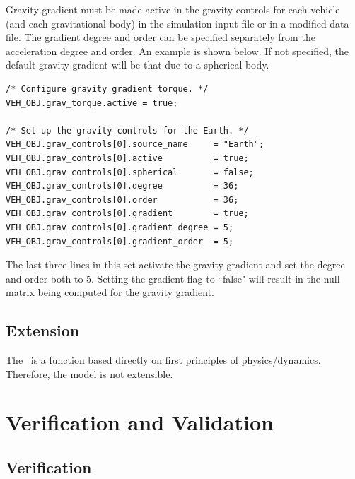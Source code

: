 Gravity gradient must be made active in the gravity controls for each vehicle (and
each gravitational body) in the simulation input file or in a modified data 
file.  The gradient degree and order can be specified separately from the acceleration
degree and order. An example is shown below. If not specified, the default gravity
gradient will be that due to a spherical body.
\begin{verbatim}
/* Configure gravity gradient torque. */
VEH_OBJ.grav_torque.active = true;

/* Set up the gravity controls for the Earth. */
VEH_OBJ.grav_controls[0].source_name     = "Earth";
VEH_OBJ.grav_controls[0].active          = true;
VEH_OBJ.grav_controls[0].spherical       = false;
VEH_OBJ.grav_controls[0].degree          = 36;
VEH_OBJ.grav_controls[0].order           = 36;
VEH_OBJ.grav_controls[0].gradient        = true;
VEH_OBJ.grav_controls[0].gradient_degree = 5;
VEH_OBJ.grav_controls[0].gradient_order  = 5;
\end{verbatim}
The last three lines in this set activate the gravity gradient and set the degree
and order both to 5. Setting the gradient flag to ``false" will result in the null 
matrix being computed for the gravity gradient. 


\section{Extension}
The \gravitytorqueDesc\ is a function based directly on first principles
of physics/dynamics.  Therefore, the model is not extensible.


\chapter{Verification and Validation}\label{ch:ivv}

\section{Verification}\label{sec:verif}

